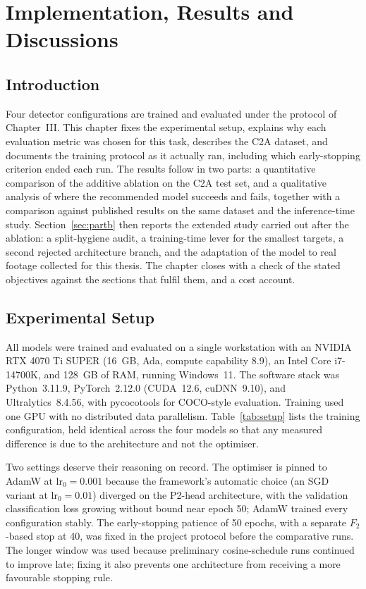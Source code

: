 \chapter{Implementation, Results and Discussions}

\section{Introduction}
Four detector configurations are trained and evaluated under the protocol of
Chapter~III. This chapter fixes the experimental
setup, explains why each evaluation metric was chosen for this task, describes
the C2A dataset, and documents the training protocol as it actually ran,
including which early-stopping criterion ended each run. The results follow in
two parts: a quantitative comparison of the additive ablation on the C2A test
set, and a qualitative analysis of where the recommended model succeeds and
fails, together with a comparison against published results on the same
dataset and the inference-time study. Section~\ref{sec:partb} then reports the
extended study carried out after the ablation: a split-hygiene audit, a
training-time lever for the smallest targets, a second rejected architecture
branch, and the adaptation of the model to real footage collected for this
thesis. The chapter closes with a check of the stated objectives against the
sections that fulfil them, and a cost account.

\section{Experimental Setup}
\label{sec:setup}
All models were trained and evaluated on a single workstation with an NVIDIA
RTX 4070 Ti SUPER (16~GB, Ada, compute capability 8.9), an Intel Core
i7-14700K, and 128~GB of RAM, running Windows~11. The software stack was
Python~3.11.9, PyTorch~2.12.0 (CUDA~12.6, cuDNN~9.10), and Ultralytics~8.4.56,
with pycocotools for COCO-style evaluation. Training used one GPU with no
distributed data parallelism. Table~\ref{tab:setup} lists the training
configuration, held identical across the four models so that any measured
difference is due to the architecture and not the optimiser.

Two settings deserve their reasoning on record. The optimiser is pinned to
AdamW at $\text{lr}_0 = 0.001$ because the framework's automatic choice
(an SGD variant at $\text{lr}_0 = 0.01$) diverged on the P2-head
architecture, with the validation classification loss growing without bound
near epoch 50; AdamW trained every configuration stably. The early-stopping
patience of 50 epochs, with a separate $F_2$-based stop at 40, was fixed in
the project protocol before the comparative runs. The longer window was used
because preliminary cosine-schedule runs continued to improve late; fixing it
also prevents one architecture from receiving a more favourable stopping rule.

